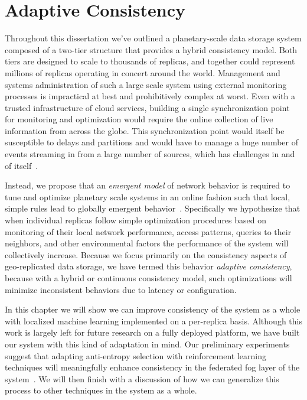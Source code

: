 
\renewcommand{\thechapter}{6}

\chapter{Adaptive Consistency}
\label{ch:adaptive_consistency}

Throughout this dissertation we've outlined a planetary-scale data storage system composed of a two-tier structure that provides a hybrid consistency model.
Both tiers are designed to scale to thousands of replicas, and together could represent millions of replicas operating in concert around the world.
Management and systems administration of such a large scale system using external monitoring processes is impractical at best and prohibitively complex at worst.
Even with a trusted infrastructure of cloud services, building a single synchronization point for monitoring and optimization would require the online collection of live information from across the globe.
This synchronization point would itself be susceptible to delays and partitions and would have to manage a huge number of events streaming in from a large number of sources, which has challenges in and of itself~\cite{spark_streaming}.

Instead, we propose that an \emph{emergent model} of network behavior is required to tune and optimize planetary scale systems in an online fashion such that local, simple rules lead to globally emergent behavior~\cite{bengfort_evolutionary_2014}.
Specifically we hypothesize that when individual replicas follow simple optimization procedures based on monitoring of their local network performance, access patterns, queries to their neighbors, and other environmental factors the performance of the system will collectively increase.
Because we focus primarily on the consistency aspects of geo-replicated data storage, we have termed this behavior \emph{adaptive consistency}, because with a hybrid or continuous consistency model, such optimizations will minimize inconsistent behaviors due to latency or configuration.

In this chapter we will show we can improve consistency of the system as a whole with localized machine learning implemented on a per-replica basis.
Although this work is largely left for future research on a fully deployed platform, we have built our system with this kind of adaptation in mind.
Our preliminary experiments suggest that adapting anti-entropy selection with reinforcement learning techniques will meaningfully enhance consistency in the federated fog layer of the system~\cite{bengfort_anti-entropy_2018}.
We will then finish with a discussion of how we can generalize this process to other techniques in the system as a whole.

